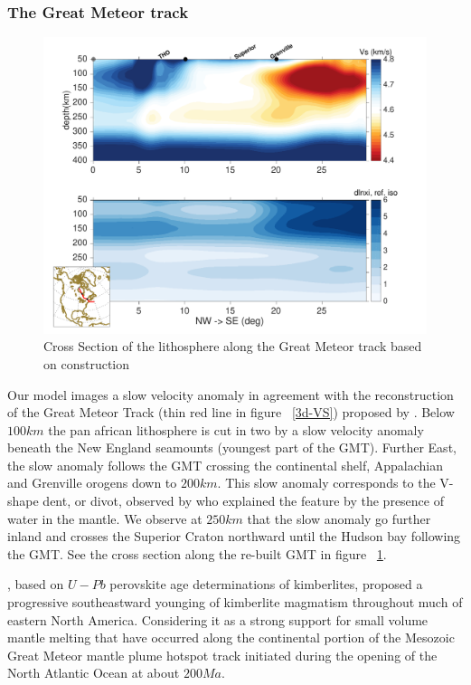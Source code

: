 \documentclass[12pt]{article}
\begin{document}
\subsubsection{The Great Meteor track}
	\begin{figure}
		\centerline{\includegraphics[width=\linewidth]{figures/profiles_NASEM3_vs_dxi_GMTrack.pdf}}

		\caption{Cross Section of the lithosphere along the Great Meteor track based on \cite{heaman2000timing} construction}
		\label{gmtcross}

	\end{figure}

	Our model images a slow velocity anomaly in agreement with the reconstruction of the Great Meteor Track (thin red line in figure ~\ref{3d-VS}) proposed by \cite{heaman2000timing}.
	Below $100km$ the pan african lithosphere is cut in two by a slow velocity anomaly beneath the New England seamounts (youngest part of the GMT). Further East, the slow anomaly follows the GMT crossing the continental shelf, Appalachian and Grenville orogens down to $200km$. 
	This slow anomaly corresponds to the V-shape dent, or divot, observed by \cite{lee1997upper} who explained the feature by the presence of water in the mantle. 
	We observe at $250km$ that the slow anomaly go further inland and crosses the Superior Craton northward until the Hudson bay following the GMT.
	See the cross section along the re-built GMT in figure ~\ref{gmtcross}.

	\cite{heaman2000timing}, based on $U-Pb$ perovskite age determinations of kimberlites, proposed a progressive southeastward younging of kimberlite magmatism throughout much of eastern North America. Considering it as a strong support for small volume mantle melting that have occurred along the continental portion of the Mesozoic Great Meteor mantle plume hotspot track initiated during the opening of the North Atlantic Ocean at about $200Ma$. \citep[See figure 4. in][]{heaman2000timing}
\end{document}
